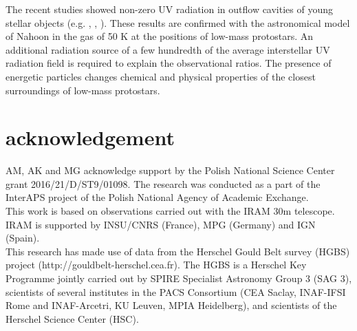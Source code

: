 \documentclass[a4paper]{article}
\begin{document}
\indent \indent The recent studies showed non-zero UV radiation in outflow cavities of young stellar objects (e.g. \cite{vanKempen2009}, \cite{kristensen2017}, \cite{karska2018}). These results are confirmed with the astronomical model of Nahoon in the gas of 50 K at the positions of low-mass protostars. An additional radiation source of a few hundredth of the average interstellar UV radiation field is required to explain the observational ratios. The presence of energetic particles changes chemical and physical properties of the closest surroundings of low-mass protostars. 

\section*{\sc acknowledgement}
\indent \indent AM, AK and MG acknowledge support by the Polish National Science Center grant 2016/21/D/ST9/01098. The research was conducted as a part of the InterAPS project of the Polish National Agency of Academic Exchange.\\
This work is based on observations carried out with the IRAM 30m telescope. IRAM is supported by INSU/CNRS (France), MPG (Germany) and IGN (Spain). \\
This research has made use of data from the Herschel Gould Belt survey (HGBS) project (http://gouldbelt-herschel.cea.fr). The HGBS is a Herschel Key Programme jointly carried out by SPIRE Specialist Astronomy Group 3 (SAG 3), scientists of several institutes in the PACS Consortium (CEA Saclay, INAF-IFSI Rome and INAF-Arcetri, KU Leuven, MPIA Heidelberg), and scientists of the Herschel Science Center (HSC).
\end{document}
